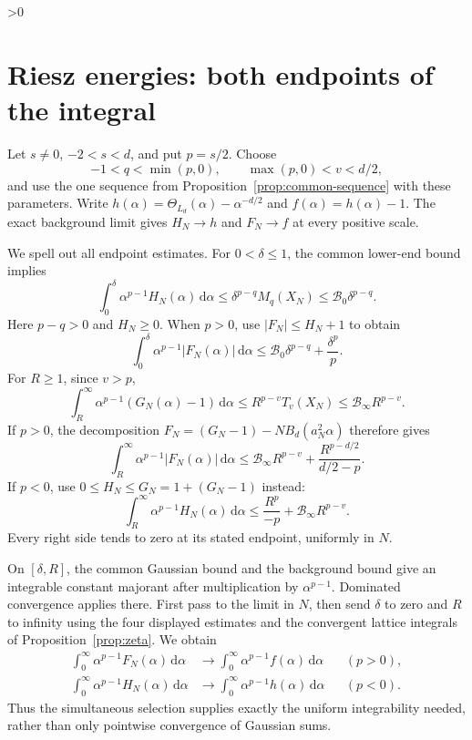 \documentclass[11pt,a4paper]{article}
\theoremstyle{definition}
\newcommand{\dd}{\,\mathrm d}
\newcommand{\abs}[1]{\lvert#1\rvert}
\numberwithin{equation}{section}
\let\originalsection\section
\renewcommand{\section}{\ifnum\value{section}>0\clearpage\fi\originalsection}
\begin{document}
\section{Riesz energies: both endpoints of the integral}\label{sec:negative}
Let $s\ne0$, $-2<s<d$, and put $p=s/2$. Choose
\begin{equation}\label{eq:riesz-budget-choice}
 -1<q<\min(p,0),\qquad \max(p,0)<v<d/2,
\end{equation}
and use the one sequence from Proposition~\ref{prop:common-sequence} with these parameters. Write
$h(\alpha)=\Theta_{L_d}(\alpha)-\alpha^{-d/2}$ and $f(\alpha)=h(\alpha)-1$.
The exact background limit gives $H_N\to h$ and $F_N\to f$ at every positive scale.

We spell out all endpoint estimates. For $0<\delta\le1$, the common lower-end bound implies
\begin{equation}\label{eq:small-weight-transfer}
 \int_0^\delta\alpha^{p-1}H_N(\alpha)\dd\alpha
 \le\delta^{p-q}M_q(X_N)\le\mathcal B_0\delta^{p-q}.
\end{equation}
Here $p-q>0$ and $H_N\ge0$. When $p>0$, use $\abs{F_N}\le H_N+1$ to obtain
\begin{equation}\label{eq:positive-small}
 \int_0^\delta\alpha^{p-1}\abs{F_N(\alpha)}\dd\alpha
 \le\mathcal B_0\delta^{p-q}+\frac{\delta^p}{p}.
\end{equation}
For $R\ge1$, since $v>p$,
\[
 \int_R^\infty\alpha^{p-1}(G_N(\alpha)-1)\dd\alpha
 \le R^{p-v}T_v(X_N)\le\mathcal B_\infty R^{p-v}.
\]
If $p>0$, the decomposition $F_N=(G_N-1)-NB_d(a_N^2\alpha)$ therefore gives
\begin{equation}\label{eq:positive-large}
 \int_R^\infty\alpha^{p-1}\abs{F_N(\alpha)}\dd\alpha
 \le\mathcal B_\infty R^{p-v}+\frac{R^{p-d/2}}{d/2-p}.
\end{equation}
If $p<0$, use $0\le H_N\le G_N=1+(G_N-1)$ instead:
\begin{equation}\label{eq:negative-large}
 \int_R^\infty\alpha^{p-1}H_N(\alpha)\dd\alpha
 \le\frac{R^p}{-p}+\mathcal B_\infty R^{p-v}.
\end{equation}
Every right side tends to zero at its stated endpoint, uniformly in $N$.

On $[\delta,R]$, the common Gaussian bound and the background bound give an integrable constant majorant after multiplication by $\alpha^{p-1}$. Dominated convergence applies there. First pass to the limit in $N$, then send $\delta$ to zero and $R$ to infinity using the four displayed estimates and the convergent lattice integrals of Proposition~\ref{prop:zeta}. We obtain
\begin{align}
 \int_0^\infty\alpha^{p-1}F_N(\alpha)\dd\alpha
     &\longrightarrow\int_0^\infty\alpha^{p-1}f(\alpha)\dd\alpha
       &&(p>0),\label{eq:positive-integral-limit}\\
 \int_0^\infty\alpha^{p-1}H_N(\alpha)\dd\alpha
     &\longrightarrow\int_0^\infty\alpha^{p-1}h(\alpha)\dd\alpha
       &&(p<0).\label{eq:negative-integral-limit}
\end{align}
Thus the simultaneous selection supplies exactly the uniform integrability needed, rather than only pointwise convergence of Gaussian sums.
\end{document}
